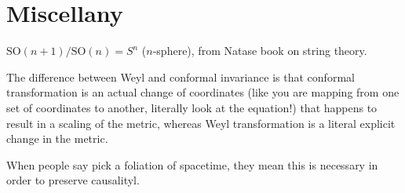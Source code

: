 \documentclass{report}
\begin{document}
\chapter{Miscellany}
$ \text{SO}(n+1)/\text{SO}(n) = S^n $ ($ n $-sphere), from Natase book on 
string theory. 

The difference between Weyl and conformal invariance is that conformal transformation 
is an actual change of coordinates (like you are mapping from one set of coordinates 
to another, literally look at the equation!) that happens to result in a scaling 
of the metric, whereas Weyl transformation is a literal explicit change in 
the metric. 

When people say pick a foliation of spacetime, they mean this is necessary 
in order to preserve causalityl.
\end{document}
